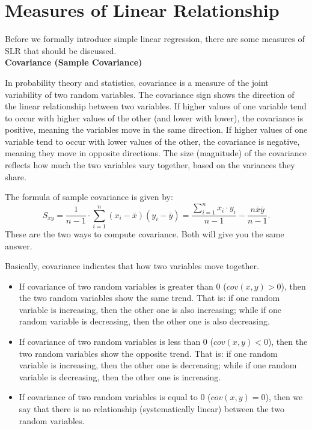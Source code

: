 \section{Measures of Linear Relationship}

Before we formally introduce simple linear regression, there are some measures of SLR that should be discussed.\\

\textbf{Covariance (Sample Covariance)}

In probability theory and statistics, covariance is a measure of the joint variability of two random variables. The covariance sign shows the direction of the linear relationship between two variables. If higher values of one variable tend to occur with higher values of the other (and lower with lower), the covariance is positive, meaning the variables move in the same direction. If higher values of one variable tend to occur with lower values of the other, the covariance is negative, meaning they move in opposite directions. The size (magnitude) of the covariance reflects how much the two variables vary together, based on the variances they share.

\begin{definition}
The formula of sample covariance is given by: \[ S_{xy} = \frac{1}{n-1} \cdot \sum_{i=1}^{n} (x_i - \bar{x})(y_i - \bar{y}) = \frac{\sum_{i = 1}^{n}x_i \cdot y_i}{n -1} - \frac{n\bar{x}\bar{y}}{n-1}.\]
These are the two ways to compute covariance. Both will give you the same answer.
\end{definition}

Basically, covariance indicates that how two variables move together.

\begin{itemize}
	\item If covariance of two random variables is greater than $0$ ($cov(x,y) > 0$), then the two random variables show the same trend. That is: if one random variable is increasing, then the other one is also increasing; while if one random variable is decreasing, then the other one is also decreasing.
	\item If covariance of two random variables is less than $0$ ($cov(x,y) < 0$), then the two random variables show the opposite trend. That is: if one random variable is increasing, then the other one is decreasing; while if one random variable is decreasing, then the other one is increasing.
	\item If covariance of two random variables is equal to $0$ ($cov(x,y) = 0$), then we say that there is no relationship (systematically linear) between the two random variables.
\end{itemize}

